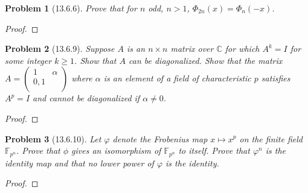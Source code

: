 \documentclass[10pt]{article}
\newcommand{\sk}{\vskip 10mm}
\newcommand{\bb}[1]{\mathbb{#1}}
\theoremstyle{plain}
\newtheorem{problem}{Problem}
\theoremstyle{remark}
\begin{document}
\begin{problem}[13.6.6]
  Prove that for $n$ odd, $n>1$, $\Phi_{2n}(x)=\Phi_n(-x)$.
\end{problem}

\begin{proof}
  
\end{proof}

\sk

\begin{problem}[13.6.9]
  Suppose $A$ is an $n\times n$ matrix over $\bb{C}$ for which $A^k=I$
  for some integer $k\geq1$. Show that $A$ can be diagonalized.
  Show that the matrix
  $A=\left(\begin{array}{cc}1&\alpha\\0,1\\ \end{array}\right)$
  where $\alpha$ is an element of a field of characteristic $p$ satisfies
  $A^p=I$ and cannot be diagonalized if $\alpha\neq 0$.
\end{problem}

\begin{proof}
  
\end{proof}

\sk

\begin{problem}[13.6.10]
  Let $\varphi$ denote the Frobenius map $x\mapsto x^p$ on the finite field
  $\bb{F}_{p^n}$. Prove that $\phi$ gives an isomorphism of $\bb{F}_{p^n}$
  to itself. Prove that $\varphi^n$ is the identity map and that no
  lower power of $\varphi$ is the identity.
\end{problem}

\begin{proof}
  
\end{proof}

\sk
\end{document}
